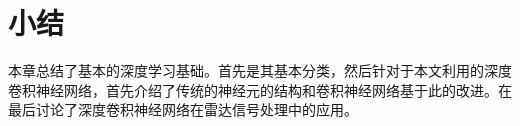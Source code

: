 \section{小结}
本章总结了基本的深度学习基础。首先是其基本分类，然后针对于本文利用的深度卷积神经网络，首先介绍了传统的神经元的结构和卷积神经网络基于此的改进。在最后讨论了深度卷积神经网络在雷达信号处理中的应用。

